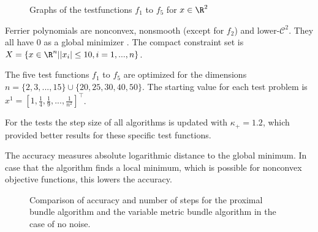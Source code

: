 \begin{figure}[ht]%
	\begin{subfigure}[t]{0.32\textwidth}
	\end{subfigure}
	\begin{subfigure}[t]{0.32\textwidth}
	\end{subfigure}
	\begin{subfigure}[t]{0.32\textwidth}
	\end{subfigure}
	\newline
	\begin{subfigure}{0.47\textwidth}
		\begin{flushright}
		\end{flushright}
		\vfil
	\end{subfigure}
	\begin{subfigure}{0.49\textwidth}
	\end{subfigure}
	\caption{Graphs of the testfunctions $f_1$ to $f_5$ for $x\in\R^2$}
	\label{fig_ferr_pol}
\end{figure}

Ferrier polynomials are nonconvex, nonsmooth (except for \(f_2\)) and lower-\(\mathcal{C}^2\). They all have \(0\) as a global minimizer \cite[p. 23]{Hare2016}. The compact constraint set is \(X=\{x \in \R^n|\lvert x_i\rvert \leq 10, i = 1,...,n \}\).

The five test functions \(f_1\) to \(f_5\) are optimized for the dimensions \(n=\{2,3,...,15\} \cup \{20,25,30,40,50\}\).
The starting value for each test problem is \(x^1=[1,\frac{1}{4},\frac{1}{9},...,\frac{1}{n^2}]^{\top}\).

For the tests the step size of all algorithms is updated with \(\kappa_+ = 1.2\), which provided better results for these specific test functions.

The accuracy measures absolute logarithmic distance to the global minimum. In case that the algorithm finds a local minimum, which is possible for nonconvex objective functions, this lowers the accuracy.


\begin{figure}[ht]%
	\begin{subfigure}{0.49\textwidth}
	\end{subfigure}
	\begin{subfigure}{0.49\textwidth}
	\end{subfigure}
	\caption{Comparison of accuracy and number of steps for the proximal bundle algorithm and the variable metric bundle algorithm in the case of no noise.}
	\label{fig_no_noise}
\end{figure}

